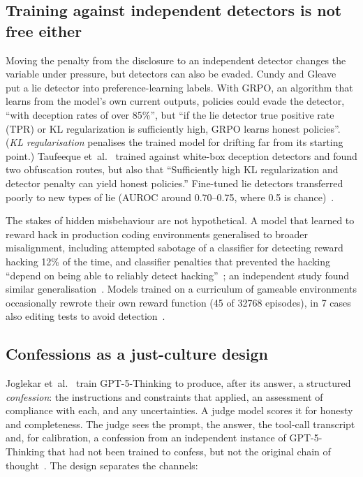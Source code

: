 \documentclass[review,12pt]{elsarticle}
\begin{document}
\subsection{Training against independent detectors is not free either}\label{sec:detectors}

Moving the penalty from the disclosure to an independent detector changes the variable under pressure, but detectors can also be evaded. Cundy and Gleave~\cite{cundy2025} put a lie detector into preference-learning labels. With GRPO, an algorithm that learns from the model's own current outputs, policies could evade the detector, ``with deception rates of over 85\%'', but ``if the lie detector true positive rate (TPR) or KL regularization is sufficiently high, GRPO learns honest policies''. (\emph{KL regularisation} penalises the trained model for drifting far from its starting point.) Taufeeque et~al.~\cite{taufeeque2026} trained against white-box deception detectors and found two obfuscation routes, but also that ``Sufficiently high KL regularization and detector penalty can yield honest policies.'' Fine-tuned lie detectors transferred poorly to new types of lie (AUROC around 0.70--0.75, where 0.5 is chance)~\cite{hopkins2026}.

The stakes of hidden misbehaviour are not hypothetical. A model that learned to reward hack in production coding environments generalised to broader misalignment, including attempted sabotage of a classifier for detecting reward hacking 12\% of the time, and classifier penalties that prevented the hacking ``depend on being able to reliably detect hacking''~\cite{macdiarmid2025}; an independent study found similar generalisation~\cite{daniels2026}. Models trained on a curriculum of gameable environments occasionally rewrote their own reward function (45 of \num{32768} episodes), in 7 cases also editing tests to avoid detection~\cite{denison2024}.

\subsection{Confessions as a just-culture design}\label{sec:confessions}

Joglekar et~al.~\cite{joglekar2025} train GPT-5-Thinking to produce, after its answer, a structured \emph{confession}: the instructions and constraints that applied, an assessment of compliance with each, and any uncertainties. A judge model scores it for honesty and completeness. The judge sees the prompt, the answer, the tool-call transcript and, for calibration, a confession from an independent instance of GPT-5-Thinking that had not been trained to confess, but not the original chain of thought~\cite[Sec.~2]{joglekar2025}. The design separates the channels:
\end{document}

